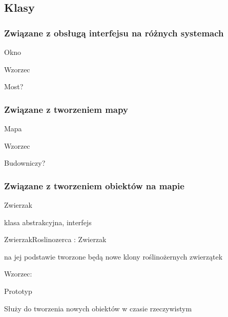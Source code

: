 \subsection*{Klasy}

\subsubsection*{Związane z obsługą interfejsu na różnych systemach}


\begin{DoxyItemize}
\item {\ttfamily Okno}
\item {\ttfamily Wzorzec}
\begin{DoxyItemize}
\item Most?
\end{DoxyItemize}
\end{DoxyItemize}

\subsubsection*{Związane z tworzeniem mapy}


\begin{DoxyItemize}
\item {\ttfamily Mapa}
\begin{DoxyItemize}
\item 
\end{DoxyItemize}
\item {\ttfamily Wzorzec}
\begin{DoxyItemize}
\item Budowniczy?
\end{DoxyItemize}
\end{DoxyItemize}

\subsubsection*{Związane z tworzeniem obiektów na mapie}


\begin{DoxyItemize}
\item {\ttfamily Zwierzak}
\begin{DoxyItemize}
\item klasa abstrakcyjna, interfejs
\end{DoxyItemize}
\item {\ttfamily Zwierzak\-Roslinozerca \-: Zwierzak}
\begin{DoxyItemize}
\item na jej podstawie tworzone będą nowe klony roślinożernych zwierzątek
\end{DoxyItemize}
\item {\ttfamily Wzorzec\-:}
\begin{DoxyItemize}
\item Prototyp
\begin{DoxyItemize}
\item Służy do tworzenia nowych obiektów w czasie rzeczywistym 
\end{DoxyItemize}
\end{DoxyItemize}
\end{DoxyItemize}